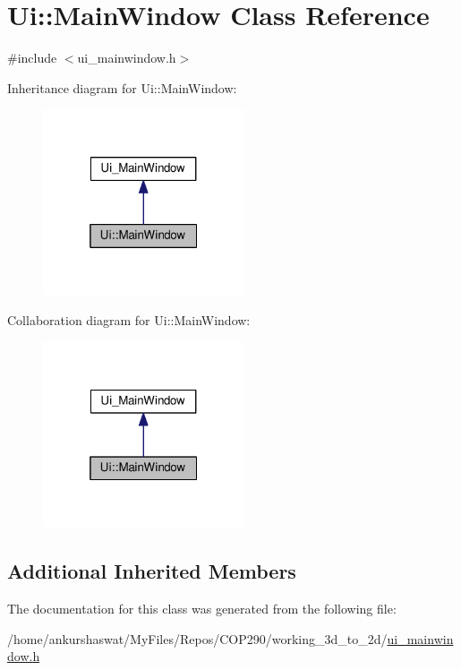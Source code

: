 \hypertarget{classUi_1_1MainWindow}{}\section{Ui\+:\+:Main\+Window Class Reference}
\label{classUi_1_1MainWindow}


{\ttfamily \#include $<$ui\+\_\+mainwindow.\+h$>$}



Inheritance diagram for Ui\+:\+:Main\+Window\+:
\nopagebreak
\begin{figure}[H]
\begin{center}
\leavevmode
\includegraphics[width=169pt]{classUi_1_1MainWindow__inherit__graph}
\end{center}
\end{figure}


Collaboration diagram for Ui\+:\+:Main\+Window\+:
\nopagebreak
\begin{figure}[H]
\begin{center}
\leavevmode
\includegraphics[width=169pt]{classUi_1_1MainWindow__coll__graph}
\end{center}
\end{figure}
\subsection*{Additional Inherited Members}


The documentation for this class was generated from the following file\+:\begin{DoxyCompactItemize}
\item 
/home/ankurshaswat/\+My\+Files/\+Repos/\+C\+O\+P290/working\+\_\+3d\+\_\+to\+\_\+2d/\hyperlink{ui__mainwindow_8h}{ui\+\_\+mainwindow.\+h}\end{DoxyCompactItemize}
